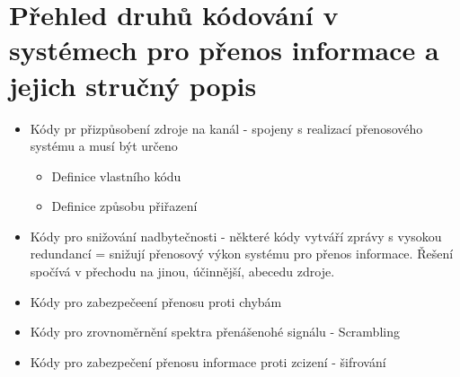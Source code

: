 \section{Přehled druhů kódování v systémech pro přenos informace a jejich stručný popis}
\begin{itemize}
    \item  Kódy pr přizpůsobení zdroje na kanál - spojeny s realizací přenosového systému a musí být určeno
\begin{itemize}
    \item Definice vlastního kódu
    \item Definice způsobu přiřazení
\end{itemize}
\item Kódy pro snižování nadbytečnosti - některé kódy vytváří zprávy s vysokou redundancí = snižují přenosový výkon systému pro přenos informace. Řešení spočívá v přechodu na jinou, účinnější, abecedu zdroje.
\item Kódy pro zabezpečeení přenosu proti chybám
\item Kódy pro zrovnoměrnění spektra přenášenohé signálu - Scrambling
\item Kódy pro zabezpečení přenosu informace proti zcizení - šifrování
\end{itemize}